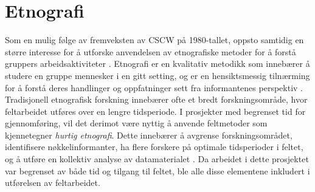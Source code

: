 \section{Etnografi}
\label{section:etnografi} 

Som en mulig følge av fremveksten av CSCW på 1980-tallet, oppsto samtidig en større interesse for å utforske anvendelsen av etnografiske metoder for å forstå gruppers arbeidsaktiviteter \citep{Blomberg93}. Etnografi er en kvalitativ metodikk som innebærer å studere en gruppe mennesker i en gitt setting, og er en hensiktsmessig tilnærming for å forstå deres handlinger og oppfatninger sett fra informantenes perspektiv \citep{Blomberg93, Reeves08, Nardi97}. Tradisjonell etnografisk forskning innebærer ofte et bredt forskningsområde, hvor feltarbeidet utføres over en lengre tidsperiode. I prosjekter med begrenset tid for gjennomføring, vil det derimot være nyttig å anvende feltmetoder som kjennetegner \textit{hurtig etnografi}. Dette innebærer å avgrense forskningsområdet, identifisere nøkkelinformanter, ha flere forskere på optimale tidsperioder i feltet, og å utføre en kollektiv analyse av datamaterialet \citep{Millen00}. Da arbeidet i dette prosjektet var begrenset av både tid og tilgang til feltet, ble alle disse elementene inkludert i utførelsen av feltarbeidet.



